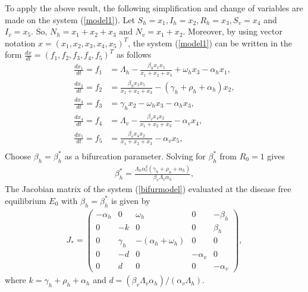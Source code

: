 \documentclass[review]{elsarticle}
\begin{document}
To apply the above result, the following simplification and change of variables are made on the system (\ref{model1}). Let $S_h=x_1,I_h=x_2,R_h=x_3,S_v=x_4$ and $I_v=x_5$. So,
$N_h=x_1+x_2+x_3\mbox{ and } N_v=x_1+x_2$.
Moreover, by using vector notation $x=(x_1,x_2,x_3,x_4,x_5)^T$, the system (\ref{model1}) can be written in the form $\frac{dx}{dt}=(f_1,f_2,f_3,f_4,f_5)^T$ as follows
\begin{equation}\label{bifurmodel}
\begin{aligned}
  \frac{dx_1}{dt}=f_1 &=\Lambda_h - \frac{\beta_h x_1x_5}{x_1+x_2+x_3}+\omega_h x_3-\alpha_h x_1, \\
  \frac{dx_2}{dt}=f_2 &= \frac{\beta_h x_1x_5}{x_1+x_2+x_3}-(\gamma_h +\rho_h +\alpha_h) x_2, \\
  \frac{dx_3}{dt}=f_3 &=  \gamma_h x_2-\omega_h x_3-\alpha_h x_3, \\
  \frac{dx_4}{dt}=f_4 &=  \Lambda_v-\frac{\beta_v x_4x_2}{x_1+x_2+x_3}-\alpha_v x_4, \\
  \frac{dx_5}{dt}=f_5 &=  \frac{\beta_v x_4x_2}{x_1+x_2+x_3}-\alpha_v x_5, \\
\end{aligned}
\end{equation}
Choose $\beta_h=\beta_h^*$ as a bifurcation parameter. Solving for $\beta_h^*$ from $R_0=1$ gives
\begin{align*}
\beta_h^*=\frac{\Lambda_h\alpha_v^2(\gamma_h +\rho_h +\alpha_h)}{\beta_v\Lambda_v\alpha_h},
\end{align*}
The Jacobian matrix of the system (\ref{bifurmodel}) evaluated at the disease free equilibrium $E_0$ with $\beta_h=\beta_h^*$ is given by
\begin{align*}
J_*=
\begin{pmatrix}
  -\alpha_h  & 0        & \omega_h             & 0         & -\beta_h \\
  0          & -k       & 0                    & 0         & \beta_h \\
  0          & \gamma_h & -(\alpha_h+\omega_h) & 0         & 0 \\
  0          & -d       & 0                    & -\alpha_v & 0 \\
  0          &  d       & 0                    & 0         & -\alpha_v
\end{pmatrix},
\end{align*}
where $k=\gamma_h +\rho_h +\alpha_h$ and $d=(\beta_v\Lambda_v\alpha_h)/(\alpha_v\Lambda_h)$.
\end{document}
